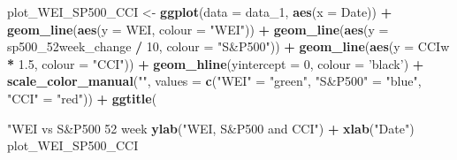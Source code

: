 \documentclass[]{article}
\newenvironment{Shaded}{\begin{snugshade}}{\end{snugshade}}
\newcommand{\KeywordTok}[1]{\textcolor[rgb]{0.13,0.29,0.53}{\textbf{#1}}}
\newcommand{\DataTypeTok}[1]{\textcolor[rgb]{0.13,0.29,0.53}{#1}}
\newcommand{\DecValTok}[1]{\textcolor[rgb]{0.00,0.00,0.81}{#1}}
\newcommand{\FloatTok}[1]{\textcolor[rgb]{0.00,0.00,0.81}{#1}}
\newcommand{\StringTok}[1]{\textcolor[rgb]{0.31,0.60,0.02}{#1}}
\newcommand{\OperatorTok}[1]{\textcolor[rgb]{0.81,0.36,0.00}{\textbf{#1}}}
\newcommand{\NormalTok}[1]{#1}
\begin{document}
\begin{Shaded}
\begin{Highlighting}[]
\NormalTok{plot_WEI_SP500_CCI <-}\StringTok{ }\KeywordTok{ggplot}\NormalTok{(}\DataTypeTok{data =}\NormalTok{ data_}\DecValTok{1}\NormalTok{, }\KeywordTok{aes}\NormalTok{(}\DataTypeTok{x =}\NormalTok{ Date)) }\OperatorTok{+}
\StringTok{  }\KeywordTok{geom_line}\NormalTok{(}\KeywordTok{aes}\NormalTok{(}\DataTypeTok{y =}\NormalTok{ WEI, }\DataTypeTok{colour =} \StringTok{"WEI"}\NormalTok{)) }\OperatorTok{+}\StringTok{ }
\StringTok{  }\KeywordTok{geom_line}\NormalTok{(}\KeywordTok{aes}\NormalTok{(}\DataTypeTok{y =}\NormalTok{ sp500_52week_change }\OperatorTok{/}\StringTok{ }\DecValTok{10}\NormalTok{, }\DataTypeTok{colour =} \StringTok{"S&P500"}\NormalTok{)) }\OperatorTok{+}
\StringTok{  }\KeywordTok{geom_line}\NormalTok{(}\KeywordTok{aes}\NormalTok{(}\DataTypeTok{y =}\NormalTok{ CCIw }\OperatorTok{*}\StringTok{ }\FloatTok{1.5}\NormalTok{, }\DataTypeTok{colour =} \StringTok{"CCI"}\NormalTok{)) }\OperatorTok{+}
\StringTok{  }\KeywordTok{geom_hline}\NormalTok{(}\DataTypeTok{yintercept =} \DecValTok{0}\NormalTok{, }\DataTypeTok{colour =} \StringTok{'black'}\NormalTok{) }\OperatorTok{+}
\StringTok{  }\KeywordTok{scale_color_manual}\NormalTok{(}\StringTok{""}\NormalTok{, }\DataTypeTok{values =} \KeywordTok{c}\NormalTok{(}\StringTok{"WEI"}\NormalTok{ =}\StringTok{ "green"}\NormalTok{, }\StringTok{"S&P500"}\NormalTok{ =}\StringTok{ "blue"}\NormalTok{, }\StringTok{"CCI"}\NormalTok{ =}\StringTok{ "red"}\NormalTok{)) }\OperatorTok{+}\StringTok{ }
\StringTok{  }\KeywordTok{ggtitle}\NormalTok{(}\StringTok{"WEI vs S&P500 52 week % change scaled by 10 vs CCI scaled by 1.5"}\NormalTok{) }\OperatorTok{+}\StringTok{ }
\StringTok{  }\KeywordTok{ylab}\NormalTok{(}\StringTok{"WEI, S&P500 and CCI"}\NormalTok{) }\OperatorTok{+}\StringTok{ }
\StringTok{  }\KeywordTok{xlab}\NormalTok{(}\StringTok{"Date"}\NormalTok{) }
\NormalTok{plot_WEI_SP500_CCI}

}
\end{Highlighting}
\end{Shaded}
\end{document}
